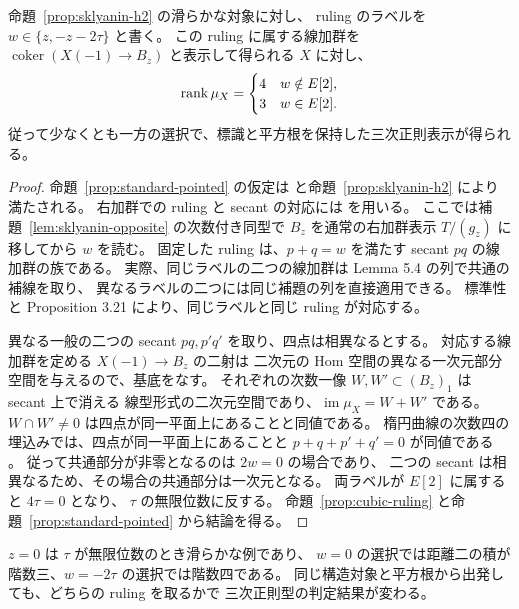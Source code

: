 \begin{proposition}
\label{prop:sklyanin-cubic-ruling}
命題~\ref{prop:sklyanin-h2} の滑らかな対象に対し、
ruling のラベルを $w\in\{z,-z-2\tau\}$ と書く。
この ruling に属する線加群を $\operatorname{coker}(X(-1)\to B_z)$
と表示して得られる $X$ に対し、
\[
 \operatorname{rank}\mu_X=
 \begin{cases}
  4 & w\notin E[2],\\
  3 & w\in E[2].
 \end{cases}
\]
従って少なくとも一方の選択で、標識と平方根を保持した三次正則表示が得られる。
\end{proposition}

\begin{proof}
命題~\ref{prop:standard-pointed} の仮定は
\cite[Lemma 5.1 and Theorem 5.5]{MUW2026} と命題~\ref{prop:sklyanin-h2} により満たされる。
右加群での ruling と secant の対応には
\cite[Lemma 3.20, Proposition 3.21 and Lemmas 5.3--5.4]{MUW2026} を用いる。
ここでは補題~\ref{lem:sklyanin-opposite} の次数付き同型で
$B_z$ を通常の右加群表示 $T/(g_z)$ に移してから $w$ を読む。
固定した ruling は、$p+q=w$ を満たす secant $pq$ の線加群の族である。
実際、同じラベルの二つの線加群は Lemma 5.4 の列で共通の補線を取り、
異なるラベルの二つには同じ補題の列を直接適用できる。
標準性と Proposition 3.21 により、同じラベルと同じ ruling が対応する。

異なる一般の二つの secant $pq,p'q'$ を取り、四点は相異なるとする。
対応する線加群を定める $X(-1)\to B_z$ の二射は
二次元の Hom 空間の異なる一次元部分空間を与えるので、基底をなす。
それぞれの次数一像 $W,W'\subset (B_z)_1$ は secant 上で消える
線型形式の二次元空間であり、$\operatorname{im}\mu_X=W+W'$ である。
$W\cap W'\ne0$ は四点が同一平面上にあることと同値である。
楕円曲線の次数四の埋込みでは、四点が同一平面上にあることと
$p+q+p'+q'=0$ が同値である \cite[\S 10.1]{SVdB2013}。
従って共通部分が非零となるのは $2w=0$ の場合であり、
二つの secant は相異なるため、その場合の共通部分は一次元となる。
両ラベルが $E[2]$ に属すると $4\tau=0$ となり、
$\tau$ の無限位数に反する。
命題~\ref{prop:cubic-ruling} と命題~\ref{prop:standard-pointed} から結論を得る。
\end{proof}

$z=0$ は $\tau$ が無限位数のとき滑らかな例であり、
$w=0$ の選択では距離二の積が階数三、$w=-2\tau$ の選択では階数四である。
同じ構造対象と平方根から出発しても、どちらの ruling を取るかで
三次正則型の判定結果が変わる。
